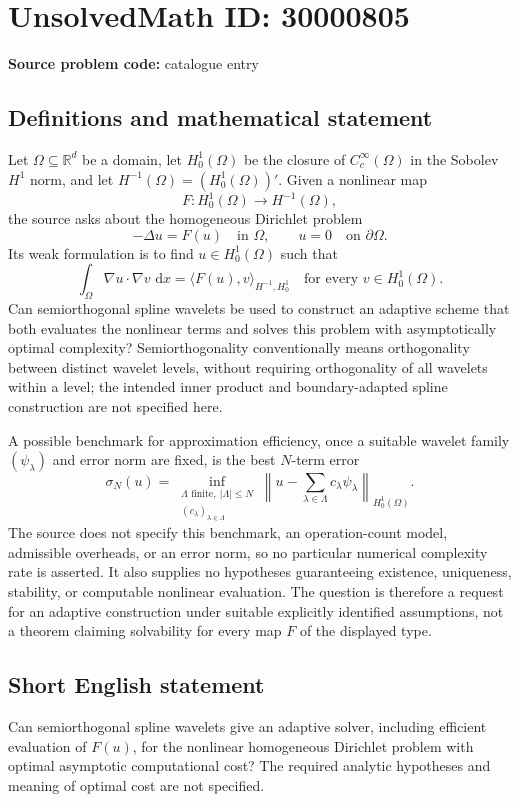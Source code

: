\documentclass[11pt]{article}
\newcommand{\R}{\mathbb{R}}
\newcommand{\dd}{\,\mathrm{d}}
\begin{document}
\section*{UnsolvedMath ID: 30000805}
\textbf{Source problem code:} catalogue entry
\subsection{Definitions and mathematical statement}
Let \(\Omega\subseteq\R^d\) be a domain, let \(H_0^1(\Omega)\) be the closure of \(C_c^\infty(\Omega)\) in the Sobolev \(H^1\) norm, and let \(H^{-1}(\Omega)=(H_0^1(\Omega))'\). Given a nonlinear map
\[
F:H_0^1(\Omega)\longrightarrow H^{-1}(\Omega),
\]
the source asks about the homogeneous Dirichlet problem
\[
-\Delta u=F(u)\quad\text{in }\Omega,\qquad u=0\quad\text{on }\partial\Omega.
\]
Its weak formulation is to find \(u\in H_0^1(\Omega)\) such that
\[
\int_{\Omega}\nabla u\cdot\nabla v\,\dd x
=\langle F(u),v\rangle_{H^{-1},H_0^1}
\quad\text{for every }v\in H_0^1(\Omega).
\]
Can semiorthogonal spline wavelets be used to construct an adaptive scheme that both evaluates the nonlinear terms and solves this problem with asymptotically optimal complexity? Semiorthogonality conventionally means orthogonality between distinct wavelet levels, without requiring orthogonality of all wavelets within a level; the intended inner product and boundary-adapted spline construction are not specified here.

A possible benchmark for approximation efficiency, once a suitable wavelet family \((\psi_\lambda)\) and error norm are fixed, is the best \(N\)-term error
\[
\sigma_N(u)=\inf_{\substack{\Lambda\text{ finite},\ |\Lambda|\leq N\\(c_\lambda)_{\lambda\in\Lambda}}}
\left\|u-\sum_{\lambda\in\Lambda}c_\lambda\psi_\lambda\right\|_{H_0^1(\Omega)}.
\]
The source does not specify this benchmark, an operation-count model, admissible overheads, or an error norm, so no particular numerical complexity rate is asserted. It also supplies no hypotheses guaranteeing existence, uniqueness, stability, or computable nonlinear evaluation. The question is therefore a request for an adaptive construction under suitable explicitly identified assumptions, not a theorem claiming solvability for every map \(F\) of the displayed type.
\subsection{Short English statement}
Can semiorthogonal spline wavelets give an adaptive solver, including efficient evaluation of \(F(u)\), for the nonlinear homogeneous Dirichlet problem with optimal asymptotic computational cost? The required analytic hypotheses and meaning of optimal cost are not specified.
\end{document}
